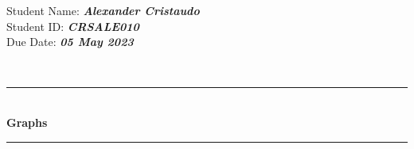 \documentclass{article}
\newcommand{\HRule}[1]{\rule{\linewidth}{#1}}
\newcommand{\assignmentTitle}[4]{
    \begin{flushleft}
    \end{flushleft}
    \begin{flushright}
    Student Name: \textbf{\textit{#1}}\\ %
    Student ID: \textbf{\textit{#2}}\\ %
    Due Date: \textbf{\textit{#3}}
    \end{flushright}
    \normalsize \textsc{}
		\\ [2.0cm]
  \begin{center}
  \rule[0pt]{247pt}{1.5pt} \\
		\LARGE {\textbf{#4} } \\ %
  \rule[0pt]{247pt}{1.5pt} 
  \end{center} %
  
   

}
\begin{document}
\assignmentTitle{Alexander Cristaudo}{CRSALE010}{05 May 2023}{Graphs}
\end{document}
